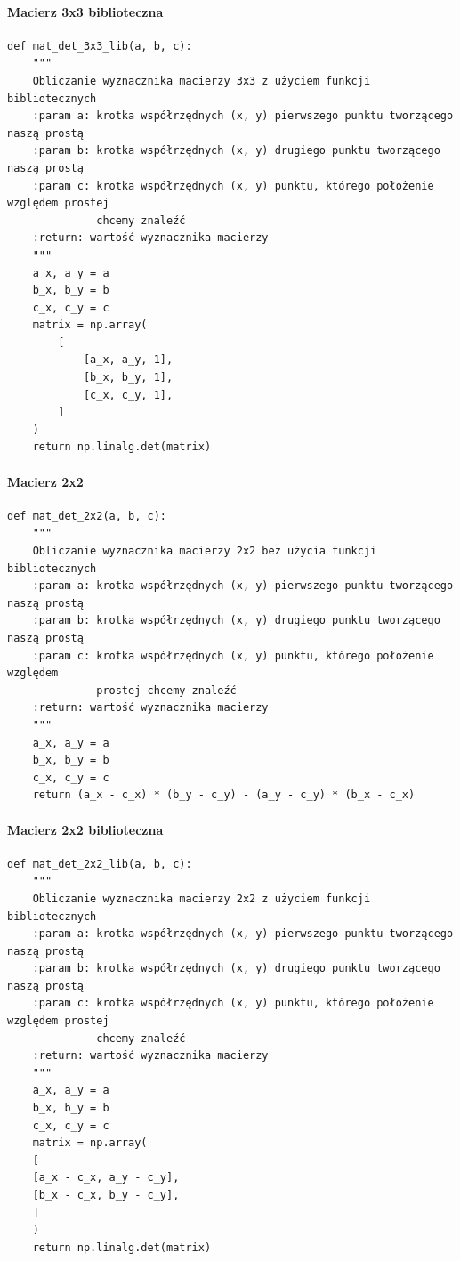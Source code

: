 \documentclass[12pt]{article}
\begin{document}
\paragraph*{Macierz 3x3 biblioteczna}
\begin{Verbatim}
def mat_det_3x3_lib(a, b, c):
	"""
	Obliczanie wyznacznika macierzy 3x3 z użyciem funkcji bibliotecznych
	:param a: krotka współrzędnych (x, y) pierwszego punktu tworzącego naszą prostą
	:param b: krotka współrzędnych (x, y) drugiego punktu tworzącego naszą prostą
	:param c: krotka współrzędnych (x, y) punktu, którego położenie względem prostej 
	          chcemy znaleźć
	:return: wartość wyznacznika macierzy
	"""
	a_x, a_y = a
	b_x, b_y = b
	c_x, c_y = c
	matrix = np.array(
		[
			[a_x, a_y, 1],
			[b_x, b_y, 1],
			[c_x, c_y, 1],
		]
	)
	return np.linalg.det(matrix)
\end{Verbatim}

\newpage

\paragraph*{Macierz 2x2}
\begin{Verbatim}
def mat_det_2x2(a, b, c):
	"""
	Obliczanie wyznacznika macierzy 2x2 bez użycia funkcji bibliotecznych
	:param a: krotka współrzędnych (x, y) pierwszego punktu tworzącego naszą prostą
	:param b: krotka współrzędnych (x, y) drugiego punktu tworzącego naszą prostą
	:param c: krotka współrzędnych (x, y) punktu, którego położenie względem 
	          prostej chcemy znaleźć
	:return: wartość wyznacznika macierzy
	"""
	a_x, a_y = a
	b_x, b_y = b
	c_x, c_y = c
	return (a_x - c_x) * (b_y - c_y) - (a_y - c_y) * (b_x - c_x)
\end{Verbatim}

\paragraph*{Macierz 2x2 biblioteczna}
\begin{Verbatim}
def mat_det_2x2_lib(a, b, c):
	"""
	Obliczanie wyznacznika macierzy 2x2 z użyciem funkcji bibliotecznych
	:param a: krotka współrzędnych (x, y) pierwszego punktu tworzącego naszą prostą
	:param b: krotka współrzędnych (x, y) drugiego punktu tworzącego naszą prostą
	:param c: krotka współrzędnych (x, y) punktu, którego położenie względem prostej 
	          chcemy znaleźć
	:return: wartość wyznacznika macierzy
	"""
	a_x, a_y = a
	b_x, b_y = b
	c_x, c_y = c
	matrix = np.array(
	[
	[a_x - c_x, a_y - c_y],
	[b_x - c_x, b_y - c_y],
	]
	)
	return np.linalg.det(matrix)
\end{Verbatim}
\end{document}
